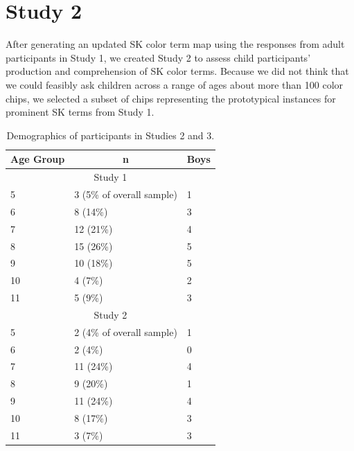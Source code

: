 \documentclass[
  english,
  ,man,floatsintext]{apa6}
\begin{document}
\hypertarget{study-2}{%
\section{Study 2}\label{study-2}}

After generating an updated SK color term map using the responses from adult participants in Study 1, we created Study 2 to assess child participants' production and comprehension of SK color terms. Because we did not think that we could feasibly ask children across a range of ages about more than 100 color chips, we selected a subset of chips representing the prototypical instances for prominent SK terms from Study 1.

\begin{table}[tbp]

\begin{center}
\begin{threeparttable}

\caption{\label{tab:study23-demographics}Demographics of participants in Studies 2 and 3.}

\begin{tabular}{lll}
\toprule
Age Group & \multicolumn{1}{c}{n} & \multicolumn{1}{c}{Boys}\\
\midrule
\multicolumn{3}{c}{Study 1}\\
5 & 3 (5\% of overall sample) & 1\\
6 & 8 (14\%) & 3\\
7 & 12 (21\%) & 4\\
8 & 15 (26\%) & 5\\
9 & 10 (18\%) & 5\\
10 & 4 (7\%) & 2\\
11 & 5 (9\%) & 3\\
\multicolumn{3}{c}{Study 2}\\
5 & 2 (4\% of overall sample) & 1\\
6 & 2 (4\%) & 0\\
7 & 11 (24\%) & 4\\
8 & 9 (20\%) & 1\\
9 & 11 (24\%) & 4\\
10 & 8 (17\%) & 3\\
11 & 3 (7\%) & 3\\
\bottomrule
\end{tabular}

\end{threeparttable}
\end{center}

\end{table}
\end{document}
